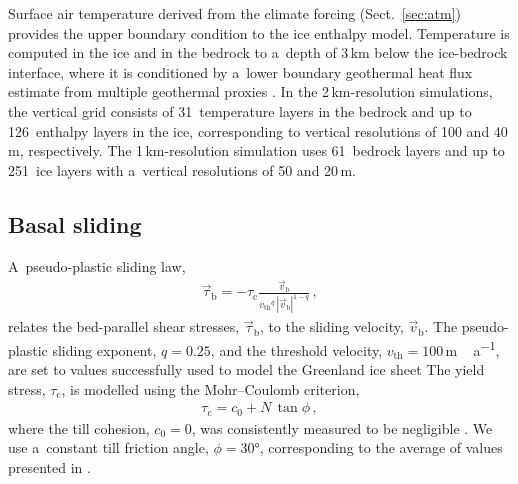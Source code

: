 \documentclass[tc, manuscript]{copernicus}
\begin{document}
    Surface air temperature derived from the climate forcing
    (Sect.~\ref{sec:atm}) provides the upper boundary condition to the ice
    enthalpy model. Temperature is computed in the ice and in the bedrock to
    a~depth of 3\,\unit{km} below the ice-bedrock interface, where it is
    conditioned by a~lower boundary geothermal heat flux estimate from multiple
    geothermal proxies \citep[similarity method]{Goutorbe.etal.2011}. In the
    2\,km-resolution simulations, the vertical grid consists of 31~temperature
    layers in the bedrock and up to 126~enthalpy layers in the ice,
    corresponding to vertical resolutions of 100 and 40\,\unit{m},
    respectively. The 1\,km-resolution simulation uses 61~bedrock layers and up
    to 251~ice layers with a~vertical resolutions of 50 and 20\,\unit{m}.


\subsection{Basal sliding}
\label{sec:sliding}

    A~pseudo-plastic sliding law,
    \begin{align}
      \vec{\tau}_{\mathrm{b}} = -\tau_{\mathrm{c}}
        \frac{\vec{v}_{\mathrm{b}}}
             {{v_{\text  {th}}}^q\,|\vec{v}_{\mathrm{b}}|^{1-q}} \,,
    \end{align}
    relates the bed-parallel shear stresses, $\vec{\tau}_{\mathrm{b}}$, to the
    sliding velocity, $\vec{v}_{\mathrm{b}}$. The pseudo-plastic sliding
    exponent, $q=0.25$, and the threshold velocity,
    $v_{\text{th}}=100$\,\unit{m\,a^{-1}}, are set to values successfully used
    to model the Greenland ice sheet \citet{Aschwanden.etal.2013} The yield
    stress, $\tau_{\mathrm{c}}$, is modelled using the Mohr--Coulomb criterion,
    \begin{align}
      \tau_{\mathrm{c}} = c_0 + N\,\tan{\phi} \,,
    \end{align}
    where the till cohesion, $c_0=0$, was consistently measured to be
    negligible \citep[p.~268]{Tulaczyk.etal.2000, Cuffey.Paterson.2010}. We use
    a~constant till friction angle, $\phi=30$\unit{\degree}, corresponding to
    the average of values presented in \citet[p.~268]{Cuffey.Paterson.2010}.
\end{document}
